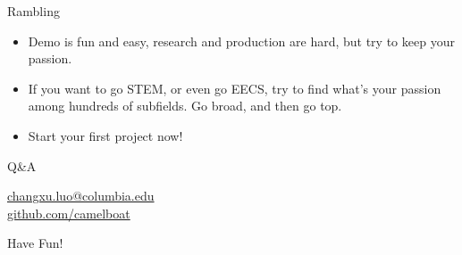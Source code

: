 \documentclass[aspectratio=169, 12pt]{beamer}
\begin{document}
\begin{frame}{Rambling}
\centering
{}
\vfill
\centering
\begin{itemize}
\scriptsize
\item Demo is fun and easy, research and production are hard, but try to keep your passion.
\item If you want to go STEM, or even go EECS, try to find what's your passion among hundreds of subfields. Go broad, and then go top.
\item Start your first project now!
\end{itemize}
\end{frame}

\begin{frame}{Q\&A}
\centering
{}
\vfill
\centering
\href{mailto:changxu.luo@columbia.edu}{changxu.luo@columbia.edu}
\\\medskip
\href{github.com/camelboat}{github.com/camelboat}
\end{frame}

\begin{frame}
\centering
\Huge
Have Fun!
\end{frame}

\end{document}
